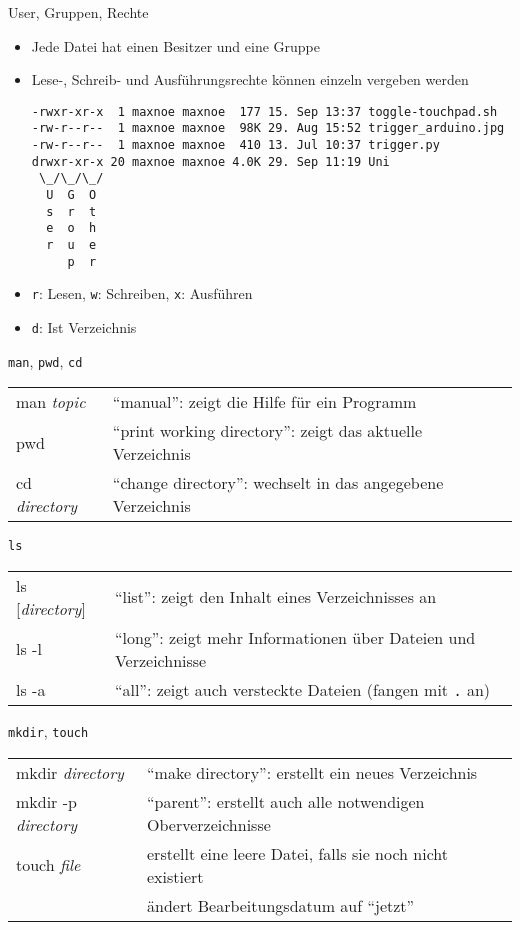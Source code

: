 \begin{frame}[fragile]{User, Gruppen, Rechte}
  \begin{itemize}
    \item Jede Datei hat einen Besitzer und eine Gruppe
    \item Lese-, Schreib- und Ausführungsrechte können einzeln vergeben werden
    \begin{verbatim}
-rwxr-xr-x  1 maxnoe maxnoe  177 15. Sep 13:37 toggle-touchpad.sh
-rw-r--r--  1 maxnoe maxnoe  98K 29. Aug 15:52 trigger_arduino.jpg
-rw-r--r--  1 maxnoe maxnoe  410 13. Jul 10:37 trigger.py
drwxr-xr-x 20 maxnoe maxnoe 4.0K 29. Sep 11:19 Uni
 \_/\_/\_/
  U  G  O
  s  r  t
  e  o  h
  r  u  e
     p  r
    \end{verbatim}
    \item \texttt{r}: Lesen, \texttt{w}: Schreiben, \texttt{x}: Ausführen 
    \item \texttt{d}: Ist Verzeichnis
  \end{itemize}
  
\end{frame}

\begin{frame}{\texttt{man}, \texttt{pwd}, \texttt{cd}}
  \begin{tabu}{>{\ttfamily}l X[,L]}
    man \textit{topic}    & \enquote{manual}: zeigt die Hilfe für ein Programm \\
    pwd                   & \enquote{print working directory}: zeigt das aktuelle Verzeichnis \\
    cd \textit{directory} & \enquote{change directory}: wechselt in das angegebene Verzeichnis
  \end{tabu}
\end{frame}

\begin{frame}{\texttt{ls}}
  \begin{tabu}{>{\ttfamily}l X[,L]}
    ls [\textit{directory}] & \enquote{list}: zeigt den Inhalt eines Verzeichnisses an \\
    ls -l                   & \enquote{long}: zeigt mehr Informationen über Dateien und Verzeichnisse \\
    ls -a                   & \enquote{all}: zeigt auch versteckte Dateien (fangen mit \texttt{.} an)
  \end{tabu}
\end{frame}

\begin{frame}{\texttt{mkdir}, \texttt{touch}}
  \begin{tabu}{>{\ttfamily}l X[,L]}
    mkdir \textit{directory}    & \enquote{make directory}: erstellt ein neues Verzeichnis \\
    mkdir -p \textit{directory} & \enquote{parent}: erstellt auch alle notwendigen Oberverzeichnisse \\
    touch \textit{file}         & erstellt eine leere Datei, falls sie noch nicht existiert \\
                                & ändert Bearbeitungsdatum auf \enquote{jetzt}
  \end{tabu}
\end{frame}

